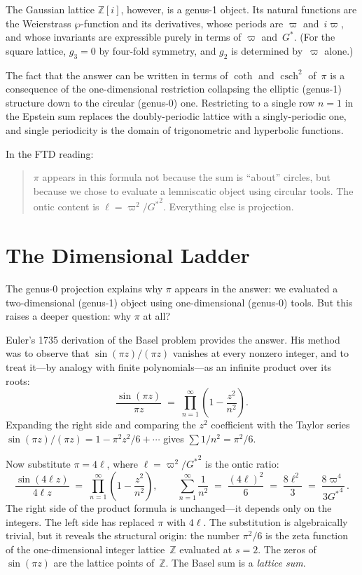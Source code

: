 \documentclass[12pt]{article}
\newcommand{\Z}{\mathbb{Z}}
\DeclareMathOperator{\csch}{csch}
\begin{document}
The Gaussian lattice $\Z[i]$, however, is a genus-1 object.  Its natural
functions are the Weierstrass $\wp$-function and its derivatives, whose
periods are $\varpi$ and~$i\varpi$, and whose invariants are expressible purely
in terms of $\varpi$ and~${G^{*}}$.  (For the square lattice, $g_3=0$ by
four-fold symmetry, and $g_2$ is determined by~$\varpi$ alone.)

The fact that the answer can be written in terms of $\coth$ and $\csch^2$
of~$\pi$ is a consequence of the one-dimensional restriction collapsing the
elliptic (genus-1) structure down to the circular (genus-0) one.
Restricting to a single row $n=1$ in the Epstein sum replaces the
doubly-periodic lattice with a singly-periodic one, and single periodicity
is the domain of trigonometric and hyperbolic functions.

In the FTD reading:
\begin{quote}
$\pi$ appears in this formula not because the sum is ``about'' circles,
but because we chose to evaluate a lemniscatic object using circular tools.
The ontic content is $\ell=\varpi^2/{G^{*}}^2$.  Everything else is
projection.
\end{quote}

\section{The Dimensional Ladder}\label{sec:ladder}

The genus-0 projection explains why $\pi$ appears in the answer: we
evaluated a two-dimensional (genus-1) object using one-dimensional
(genus-0) tools.  But this raises a deeper question: why $\pi$ at all?

Euler's 1735 derivation of the Basel problem provides the answer.  His
method was to observe that $\sin(\pi z)/(\pi z)$ vanishes at every
nonzero integer, and to treat it---by analogy with finite
polynomials---as an infinite product over its roots:
\begin{equation}\label{eq:euler-product}
\frac{\sin(\pi z)}{\pi z}
\;=\; \prod_{n=1}^{\infty}\!\left(1 - \frac{z^2}{n^2}\right).
\end{equation}
Expanding the right side and comparing the $z^2$ coefficient with the
Taylor series $\sin(\pi z)/(\pi z) = 1 - \pi^2 z^2/6 + \cdots$ gives
$\sum 1/n^2 = \pi^2/6$.

Now substitute $\pi = 4\ell$, where $\ell = \varpi^2/{G^{*}}^2$ is the
ontic ratio:
\[
\frac{\sin(4\ell z)}{4\ell z}
\;=\; \prod_{n=1}^{\infty}\!\left(1 - \frac{z^2}{n^2}\right),
\qquad
\sum_{n=1}^{\infty}\frac{1}{n^2}
\;=\; \frac{(4\ell)^2}{6}
\;=\; \frac{8\ell^2}{3}
\;=\; \frac{8\varpi^4}{3{G^{*}}^4}\,.
\]
The right side of the product formula is unchanged---it depends only on
the integers.  The left side has replaced $\pi$ with $4\ell$.  The
substitution is algebraically trivial, but it reveals the structural
origin: the number $\pi^2/6$ is the zeta function of the
one-dimensional integer lattice~$\Z$ evaluated at $s = 2$.  The zeros
of $\sin(\pi z)$ are the lattice points of~$\Z$.  The Basel sum is a
\emph{lattice sum}.
\end{document}
